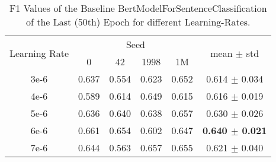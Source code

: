 \begin{table}[h]
    \centering
    \caption{F1 Values of the Baseline BertModelForSentenceClassification of the Last (50th) Epoch
             for different Learning-Rates.}
    \label{tab:my-lr}
    \begin{tabular}{|c||cccc|c|}
    \hline
    \multicolumn{1}{|l||}{\multirow{2}{*}{Learning Rate}} & \multicolumn{4}{c|}{Seed}                                                                    & \multicolumn{1}{c|}{\multirow{2}{*}{mean $\pm$ std}} \\ \cline{2-5}
    \multicolumn{1}{|l||}{}                               & \multicolumn{1}{c|}{0}     & \multicolumn{1}{c|}{42}    & \multicolumn{1}{c|}{1998}  & 1M    & \multicolumn{1}{c|}{}                                \\ \hline\hline
    3e-6                                                 & \multicolumn{1}{c|}{0.637} & \multicolumn{1}{c|}{0.554} & \multicolumn{1}{c|}{0.623} & 0.652 & 0.614 $\pm$ 0.034                           \\ \hline
    4e-6                                                 & \multicolumn{1}{c|}{0.589} & \multicolumn{1}{c|}{0.614} & \multicolumn{1}{c|}{0.649} & 0.615 & 0.616 $\pm$ 0.019                                    \\ \hline
    5e-6                                                 & \multicolumn{1}{c|}{0.636} & \multicolumn{1}{c|}{0.640} & \multicolumn{1}{c|}{0.638} & 0.657 & 0.630 $\pm$ 0.026                                    \\ \hline
    6e-6                                                 & \multicolumn{1}{c|}{0.661} & \multicolumn{1}{c|}{0.654} & \multicolumn{1}{c|}{0.602} & 0.647 & \textbf{0.640 $\pm$ 0.021}                                    \\ \hline
    7e-6                                                 & \multicolumn{1}{c|}{0.644} & \multicolumn{1}{c|}{0.563} & \multicolumn{1}{c|}{0.657} & 0.655 & 0.621 $\pm$ 0.040                                    \\ \hline
    \end{tabular}
\end{table}












